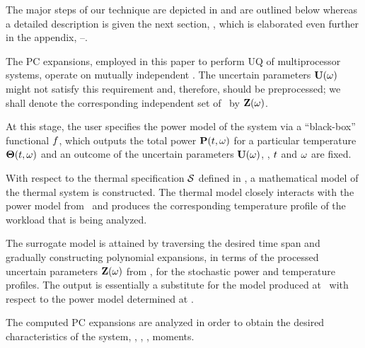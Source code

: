 The major steps of our technique are depicted in  and are outlined below whereas a detailed description is given the next section, , which is elaborated even further in the appendix, --.

 The PC expansions, employed in this paper to perform UQ of multiprocessor systems, operate on mutually independent \rvs. The uncertain parameters $\mathbf{U}(\omega)$ might not satisfy this requirement and, therefore, should be preprocessed; we shall denote the corresponding independent set of \rvs\ by $\mathbf{Z}(\omega)$.

 At this stage, the user specifies the power model of the system via a ``black-box'' functional $f$, which outputs the total power $\mathbf{P}(t, \omega)$ for a particular temperature ${\boldsymbol\Theta}(t, \omega)$ and an outcome of the uncertain parameters $\mathbf{U}(\omega)$, \ie, $t$ and $\omega$ are fixed.

 With respect to the thermal specification $\mathcal{S}$ defined in , a mathematical model of the thermal system is constructed. The thermal model closely interacts with the power model from \ and produces the corresponding temperature profile of the workload that is being analyzed.

 The surrogate model is attained by traversing the desired time span and gradually constructing polynomial expansions, in terms of the processed uncertain parameters $\mathbf{Z}(\omega)$ from , for the stochastic power and temperature profiles. The output is essentially a substitute for the model produced at \ with respect to the power model determined at .

 The computed PC expansions are analyzed in order to obtain the desired characteristics of the system, \eg, \cdfs, \pdfs, moments.
